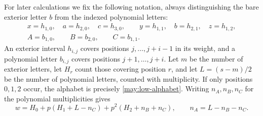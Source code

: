 For later calculations we fix the following notation, always
distinguishing the bare exterior letter $b$ from the indexed polynomial
letters:
\begin{equation}
\begin{gathered}
 x=h_{1,0},\quad a=h_{2,0},\quad c=h_{3,0},\qquad
 y=h_{1,1},\quad b=h_{2,1},\quad z=h_{1,2},\\
 A=b_{1,0},\qquad B=b_{2,0},\qquad C=b_{1,1}.
\end{gathered}
\label{may:low-alphabet}
\end{equation}
An exterior interval $h_{i,j}$ covers positions
$j,\ldots,j+i-1$ in its weight, and a polynomial letter $b_{i,j}$
covers positions $j+1,\ldots,j+i$.  Let $m$ be the number of exterior
letters, let $H_r$ count those covering position $r$, and let
$L=(s-m)/2$ be the number of polynomial letters, counted with
multiplicity.  If only positions $0,1,2$ occur, the alphabet is precisely
\eqref{may:low-alphabet}.  Writing $n_A,n_B,n_C$ for the polynomial
multiplicities gives
\begin{equation}
 w=H_0+p(H_1+L-n_C)+p^2(H_2+n_B+n_C),
 \qquad n_A=L-n_B-n_C.
 \label{may:three-position-weight}
\end{equation}
